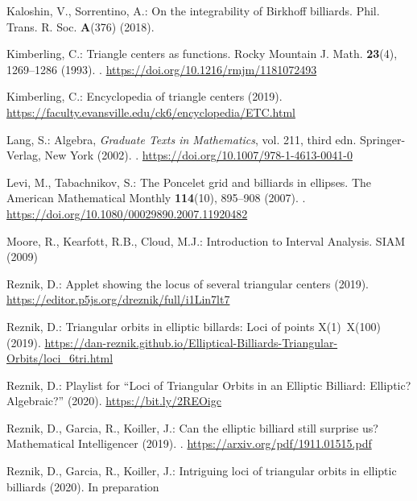 \begin{thebibliography}{10}
Kaloshin, V., Sorrentino, A.: On the integrability of {B}irkhoff billiards.
\newblock Phil. Trans. R. Soc. \textbf{A}(376) (2018).
\newblock {}

Kimberling, C.: Triangle centers as functions.
\newblock Rocky Mountain J. Math. \textbf{23}(4), 1269--1286 (1993).
\newblock {}.
\newblock \urlprefix\url{https://doi.org/10.1216/rmjm/1181072493}

Kimberling, C.: Encyclopedia of triangle centers (2019).
\newblock
  \urlprefix\url{https://faculty.evansville.edu/ck6/encyclopedia/ETC.html}

Lang, S.: Algebra, \emph{Graduate Texts in Mathematics}, vol. 211, third edn.
\newblock Springer-Verlag, New York (2002).
\newblock {}.
\newblock \urlprefix\url{https://doi.org/10.1007/978-1-4613-0041-0}

Levi, M., Tabachnikov, S.: The {P}oncelet grid and billiards in ellipses.
\newblock The American Mathematical Monthly \textbf{114}(10), 895--908 (2007).
\newblock {}.
\newblock \urlprefix\url{https://doi.org/10.1080/00029890.2007.11920482}

Moore, R., Kearfott, R.B., Cloud, M.J.: Introduction to Interval Analysis.
\newblock SIAM (2009)

Reznik, D.: Applet showing the locus of several triangular centers (2019).
\newblock \urlprefix\url{https://editor.p5js.org/dreznik/full/i1Lin7lt7}

Reznik, D.: Triangular orbits in elliptic billards: Loci of points
  {X(1)~X(100)} (2019).
\newblock
  \urlprefix\url{https://dan-reznik.github.io/Elliptical-Billiards-Triangular-Orbits/loci_6tri.html}

Reznik, D.: Playlist for {``Loci of Triangular Orbits in an Elliptic Billiard:
  Elliptic? Algebraic?''} (2020).
\newblock \urlprefix\url{https://bit.ly/2REOigc}

Reznik, D., Garcia, R., Koiller, J.: Can the elliptic billiard still surprise
  us?
\newblock Mathematical Intelligencer  (2019).
\newblock {}.
\newblock \urlprefix\url{https://arxiv.org/pdf/1911.01515.pdf}

Reznik, D., Garcia, R., Koiller, J.: Intriguing loci of triangular orbits in
  elliptic billiards (2020).
\newblock In preparation


\end{thebibliography}
